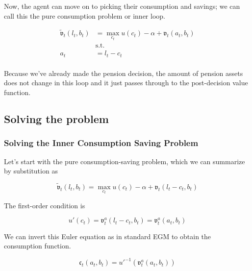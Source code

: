 \documentclass{article}
\newcommand{\util}{u}
\newcommand{\bRat}{b}
\newcommand{\cRat}{c}
\newcommand{\aRat}{a}
\newcommand{\vOpt}{\tilde{\mathfrak{v}}}
\newcommand{\vEnd}{\mathfrak{v}}
\newcommand{\cEndFunc}{\mathfrak{c}}
\newcommand{\lRat}{l}
\newcommand{\kapShare}{\alpha}
\begin{document}
Now, the agent can move on to picking their consumption and savings; we can call this
the pure consumption problem or inner loop.

\begin{equation}
\begin{split}
        \vOpt_{t}(\lRat_{t}, \bRat_{t}) & = \max_{\cRat_{t}}
        \util(\cRat_{t}) - \kapShare  + \vEnd_{t}(\aRat_{t}, \bRat_{t}) \\
        & \text{s.t.} \\
        \aRat_{t} & = \lRat_{t} - \cRat_{t} \\
    \end{split}
\end{equation}

Because we've already made the pension decision, the amount of pension assets
does not change in this loop and it just passes through to the post-decision
value function.

\subsection{Solving the problem}\label{Solving the problem}

\subsubsection{Solving the Inner Consumption Saving Problem}\label{Solving the Inner Consumption Saving Problem}

Let's start with the pure consumption-saving problem, which we can summarize by
substitution as

\begin{equation}
\vOpt_{t}(\lRat_{t}, \bRat_{t}) = \max_{\cRat_{t}} \util(\cRat_{t}) - \kapShare +
    \vEnd_{t}(\lRat_{t} - \cRat_{t}, \bRat_{t})
\end{equation}

The first-order condition is

\begin{equation}
\util'(\cRat_{t}) = \vEnd_{t}^{\aRat}(\lRat_{t}-\cRat_{t}, \bRat_{t}) =
    \vEnd_{t}^{\aRat}(\aRat_{t}, \bRat_{t})
\end{equation}

We can invert this Euler equation as in standard EGM to obtain the consumption
function.

\begin{equation}
\cEndFunc_{t}(\aRat_{t}, \bRat_{t}) =
    \util'^{-1}\left(\vEnd_{t}^{\aRat}(\aRat_{t}, \bRat_{t})\right)
\end{equation}
\end{document}
